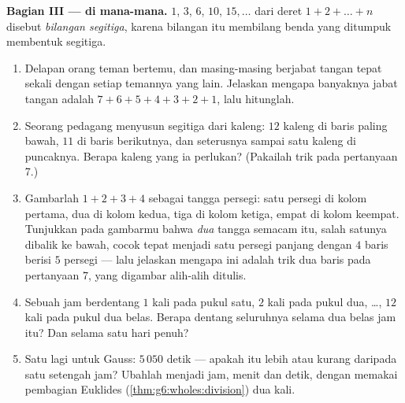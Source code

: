 \begin{problem}
\medskip
\noindent\textbf{Bagian III ---  di mana-mana.}
 $1$, $3$, $6$, $10$, $15, \dots$ dari deret
$1 + 2 + \dots + n$ disebut \emph{bilangan
segitiga}, karena bilangan itu membilang
benda yang ditumpuk membentuk segitiga.
\begin{enumerate}[resume]
  \item Delapan orang teman bertemu, dan masing-masing berjabat
        tangan tepat sekali dengan setiap temannya yang lain.
        Jelaskan mengapa banyaknya jabat tangan adalah
        $7 + 6 + 5 + 4 + 3 + 2 + 1$, lalu hitunglah.
  \item Seorang pedagang menyusun  segitiga dari kaleng: $12$
        kaleng di baris paling bawah, $11$ di baris berikutnya, dan
        seterusnya sampai satu kaleng di puncaknya. Berapa kaleng
        yang ia perlukan? (Pakailah trik pada pertanyaan 7.)
  \item Gambarlah  $1 + 2 + 3 + 4$ sebagai tangga persegi: satu
        persegi di kolom pertama, dua di kolom kedua, tiga di kolom
        ketiga, empat di kolom keempat. Tunjukkan pada gambarmu bahwa
        \emph{dua} tangga semacam itu, salah satunya dibalik ke
        bawah, cocok tepat menjadi satu persegi panjang dengan $4$
        baris berisi $5$ persegi --- lalu jelaskan mengapa ini adalah trik dua
        baris pada pertanyaan 7, yang digambar alih-alih ditulis.
  \item Sebuah jam berdentang $1$ kali pada pukul satu, $2$ kali pada
        pukul dua, \dots, $12$ kali pada pukul dua belas. Berapa
        dentang seluruhnya selama dua belas jam itu? Dan selama satu
        hari penuh?
  \item Satu lagi untuk Gauss: $5\,050$ detik --- apakah itu lebih
        atau kurang daripada satu setengah jam? Ubahlah menjadi jam,
        menit dan detik, dengan memakai pembagian Euklides
        (\cref{thm:g6:wholes:division}) dua kali.

\end{enumerate}
\end{problem}
